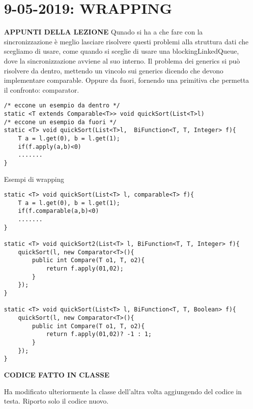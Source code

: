 

\newpage
\section{9-05-2019: WRAPPING}
\noindent \textbf{APPUNTI DELLA LEZIONE} \newline
Qunado si ha a che fare con la sincronizzazione è meglio lasciare risolvere questi problemi alla struttura dati che scegliamo di usare, come quando si sceglie di usare una blockingLinkedQueue, dove la sincronizzazione avviene al suo interno. \newline
Il problema dei generics si può risolvere da dentro, mettendo un vincolo sui generics dicendo che devono implementare comparable. Oppure da fuori, fornendo una primitiva che permetta il confronto: comparator. \newline
\begin{lstlisting}
/* eccone un esempio da dentro */
static <T extends Comparable<T>> void quickSort(List<T>l)
/* eccone un esempio da fuori */
static <T> void quickSort(List<T>l,  BiFunction<T, T, Integer> f){
	T a = l.get(0), b = l.get(1);
	if(f.apply(a,b)<0)
	.......
}
\end{lstlisting}

\noindent Esempi di wrapping
\begin{lstlisting}
static <T> void quickSort(List<T> l, comparable<T> f){
	T a = l.get(0), b = l.get(1);
	if(f.comparable(a,b)<0)
	.......
}

static <T> void quickSort2(List<T> l, BiFunction<T, T, Integer> f){
	quickSort(l, new Comparator<T>(){
		public int Compare(T o1, T, o2){
			return f.apply(01,02);
		}
	});
}

static <T> void quickSort(List<T> l, BiFunction<T, T, Boolean> f){
	quickSort(l, new Comparator<T>(){
		public int Compare(T o1, T, o2){
			return f.apply(01,02)? -1 : 1;
		}
	});
}

\end{lstlisting}
\noindent \textbf{CODICE FATTO IN CLASSE} \newline

\noindent Ha modificato ulteriormente la classe dell'altra volta aggiungendo del codice in testa. Riporto solo il codice nuovo.
 
